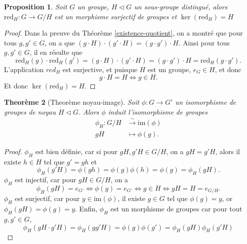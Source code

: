 \documentclass[french]{article}
\theoremstyle{plain}
\newtheorem{thm}{Theorème}[section]
\newtheorem{prop}[thm]{Proposition}
\theoremstyle{remark}
\theoremstyle{definition}
\newcommand{\red}{\mathrm{red}}
\newcommand{\im}{\mathrm{im}}
\begin{document}
\begin{prop}
	Soit $G$ un groupe, $H \triangleleft G$ un sous-groupe distingué, alors $\red_H : G \to G/H$ est un morphisme surjectif de groupes et $\ker(\red_H) = H$
\end{prop}

\begin{proof}	
	Dans la preuve du Théorème \ref{existence-quotient}, on a montré que pour tous
	$g, g' \in G$, on a que $(g \cdot H) \cdot (g' \cdot H) = (g \cdot g') \cdot H$.
	Ainsi pour tous $g, g' \in G$, il en résulte que
	\begin{equation*}
		\red_H(g) \cdot \red_H(g') = (g \cdot H) \cdot (g' \cdot H)
		= (g \cdot g') \cdot H = \red_H(g \cdot g').
	\end{equation*}
	L'application $red_H$ est surjective, et puisque $H$ est un groupe, $e_G \in H$,
	et donc
	\begin{equation*}
		g \cdot H = H \iff g \in H.	
	\end{equation*}
	Et donc $\ker(\red_H) = H$.
\end{proof}


\begin{thm}[Theorème noyau-image]
	\label{noyau-image}
	Soit $\phi : G \to G'$ un isomorphisme de groupes de noyau $H \triangleleft G$.
	Alors $\phi$ induit l'isomorphisme de groupes
	\begin{align*}
		\phi_H: G/H &\xrightarrow{\sim} \im(\phi)\\
		g H &\mapsto \phi(g).
	\end{align*}
\end{thm}

\begin{proof}
	$\phi_H$ est bien définie, car si pour $g H, g'H \in G/H$, on a $gH = g'H$,
	alors il existe $h \in H$ tel que $g' = gh$ et
	\begin{equation*}
		\phi_H(g'H) = \phi(gh) = \phi(g)\phi(h) = \phi(g) = \phi_H(gH).
	\end{equation*}
	$\phi_H$ est injectif, car pour $gH \in G/H$, on a
	\begin{equation*}
		\phi_H(gH) = e_{G'} \iff \phi(g) = e_{G'} \iff g \in H \iff gH = H = e_{G/H}.
	\end{equation*}
	$\phi_H$ est surjectif, car pour $y \in \im(\phi)$, il existe $g \in G$ 
	tel que $\phi(g) = y$, or $\phi_H(gH) = \phi(g) = y$.
	Enfin, $\phi_H$ est un morphisme de groupes car pour tout $g, g' \in G$,
	\begin{equation*}
		\phi_H(gH \cdot g'H) = \phi_H(gg'H) = \phi(g)\phi(g') = \phi_H(gH)\phi_H(g'H)
	\end{equation*}
\end{proof}
\end{document}
